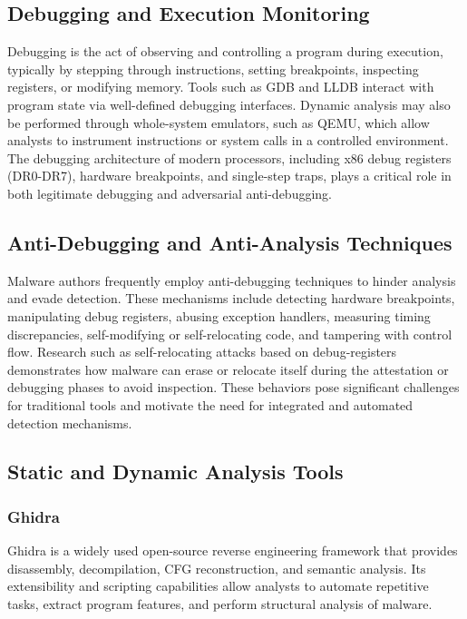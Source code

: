 \documentclass[conference]{IEEEtran}
\begin{document}
\subsection{Debugging and Execution Monitoring}

Debugging is the act of observing and controlling a program during execution, typically by stepping through instructions, setting breakpoints, inspecting registers, or modifying memory. Tools such as GDB and LLDB interact with program state via well-defined debugging interfaces. Dynamic analysis may also be performed through whole-system emulators, such as QEMU, which allow analysts to instrument instructions or system calls in a controlled environment. The debugging architecture of modern processors, including x86 debug registers (DR0-DR7), hardware breakpoints, and single-step traps, plays a critical role in both legitimate debugging and adversarial anti-debugging.

\subsection{Anti-Debugging and Anti-Analysis Techniques}

Malware authors frequently employ anti-debugging techniques to hinder analysis and evade detection. These mechanisms include detecting hardware breakpoints, manipulating debug registers, abusing exception handlers, measuring timing discrepancies, self-modifying or self-relocating code, and tampering with control flow. Research such as self-relocating attacks based on debug-registers demonstrates how malware can erase or relocate itself during the attestation or debugging phases to avoid inspection. These behaviors pose significant challenges for traditional tools and motivate the need for integrated and automated detection mechanisms.

\subsection{Static and Dynamic Analysis Tools}

\subsubsection{Ghidra}
Ghidra is a widely used open-source reverse engineering framework that provides disassembly, decompilation, CFG reconstruction, and semantic analysis. Its extensibility and scripting capabilities allow analysts to automate repetitive tasks, extract program features, and perform structural analysis of malware.
\end{document}

